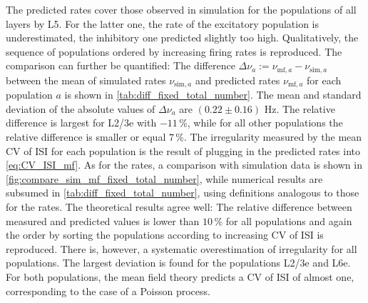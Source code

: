 The predicted rates cover those observed in simulation for the populations 
of all layers by L5. For the latter one, the rate of the excitatory population
is underestimated, the inhibitory one predicted slightly too high. 
Qualitatively, the sequence of populations ordered by increasing firing rates is reproduced.
The comparison can further be quantified: The difference 
$    \Delta \nu_a := \nu_{\text{mf}, a} - \nu_{\text{sim}, a} $
between the mean of simulated rates $\nu_{\text{sim}, a}$ and predicted rates 
$\nu_{\text{mf}, a}$ for each population $a$ is shown in \autoref{tab:diff_fixed_total_number}. 
The mean and standard 
deviation of the absolute values of $\Delta \nu_a$ 
are $(0.22 \pm  0.16)$ Hz. The relative difference
is largest for L2/3e with $-11\,\%$, while for all other populations 
the relative difference is smaller or equal $7\,\%$. 
The irregularity measured by the mean CV of ISI for each population is the result of 
plugging in the predicted rates into \autoref{eq:CV_ISI_mf}. 
As for the rates, a comparison with simulation data is shown
in \autoref{fig:compare_sim_mf_fixed_total_number}, 
while numerical results are subsumed in 
\autoref{tab:diff_fixed_total_number}, using definitions analogous to those for the rates.
The theoretical results agree well: The relative difference between measured and
predicted values is lower than $10\,\%$ for all populations and again the order 
by sorting the populations according to increasing CV of ISI is reproduced. 
There is, however, a systematic overestimation of irregularity for all populations. 
The largest deviation is found for the populations L2/3e and L6e. For both populations, 
the mean field theory predicts a CV of ISI of almost one, corresponding to the case of 
a Poisson process. 

